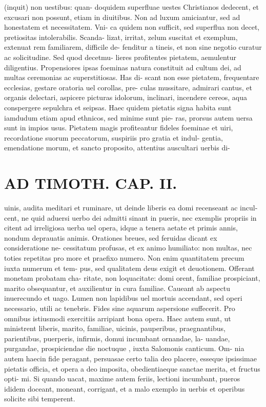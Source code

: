 \documentclass{article}
\begin{document}
\begin{pages}
(inquit) non uestibus: quan- doquidem superfluae uestes Christianos dedecent, et excusari non possunt, etiam in diuitibus. Non ad luxum amiciantur, sed ad honestatem et necessitatem. Vni- ca quidem non sufficit, sed superflua non decet, pretiositas intolerabilis. Scanda- lizat, irritat, zelum suscitat et exemplum, extenuat rem familiarem, difficile de- fenditur a tineis, et non sine negotio curatur ac solicitudine. Sed quod decetmu- lieres profitentes pietatem, aemulentur diligentius. Propensiores ipsas foeminas natura constituit ad cultum dei, ad multas ceremonias ac superstitiosas. Has di- scant non esse pietatem, frequentare ecclesias, gestare oratoria uel corollas, pre- culas mussitare, admirari cantus, et organis delectari, aspicere picturas idolorum, inclinari, incendere cereos, aqua conspergere sepulchra et seipsas. Haec quidem pietatis signa habita sunt iamdudum etiam apud ethnicos, sed minime sunt pie- ras, prorsus autem uersa sunt in impios usus. Pietatem magis profiteantur fideles foeminae et uiri, recordatione suorum peccatorum, suspiriis pro gratia et indul- gentia, emendatione morum, et sancto proposito, attentius auscultari uerbis di-  \pend
\section*{AD TIMOTH. CAP. II. }
\marginpar{[ p.487 ]}\pstart uinis, audita meditari et ruminare, ut deinde liberis ea domi recenseant ac incul- cent, ne quid aduersi uerbo dei admitti sinant in pueris, nec exemplis propriis in citent ad irreligiosa uerba uel opera, idque a tenera aetate et primis annis, nondum deprauatis animis. Orationes breues, sed feruidas dicant ex consideratione ne- cessitatum profusas, et ex animo humiliato: non multas, nec toties repetitas pro more et praefixo numero. Non enim quantitatem precum iuxta numerum et tem- pus, sed qualitatem deus exigit et deuotionem. Offerant monetam probatam cha- ritate, non loquacitate: domi orent, familiae prospiciant, marito obsequantur, et auxilientur in cura familiae. Caueant ab aspectu inuerecundo et uago. Lumen non lapidibus uel mortuis accendant, sed operi necessario, utili ac tenebris. Fides sine aquarum aspersione suffecerit. Pro omnibus istiusmodi exercitiis arripiant bona opera. Haec autem sunt, ut ministrent liberis, marito, familiae, uicinis, pauperibus, praegnantibus, parientibus, puerperis, infirmis, domui incumbant ornandae, la- uandae, purgandae, prospiciendae die noctuque , iuxta Salomonis canticum. Om- nia autem haecin fide peragant, persuasae certo talia deo placere, esseque ipsissimae pietatis officia, et opera a deo imposita, obedientiaeque sanctae merita, et fructus opti- mi. Si quando uacat, maxime autem feriis, lectioni incumbant, pueros ididem doceant, moneant, corrigant, et a malo exemplo in uerbis et operibus solicite sibi temperent.  \pend
{}
{}

\end{pages}
\end{document}
